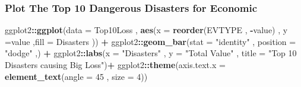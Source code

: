 \documentclass[
]{article}
\newenvironment{Shaded}{\begin{snugshade}}{\end{snugshade}}
\newcommand{\DataTypeTok}[1]{\textcolor[rgb]{0.13,0.29,0.53}{#1}}
\newcommand{\DecValTok}[1]{\textcolor[rgb]{0.00,0.00,0.81}{#1}}
\newcommand{\KeywordTok}[1]{\textcolor[rgb]{0.13,0.29,0.53}{\textbf{#1}}}
\newcommand{\NormalTok}[1]{#1}
\newcommand{\OperatorTok}[1]{\textcolor[rgb]{0.81,0.36,0.00}{\textbf{#1}}}
\newcommand{\StringTok}[1]{\textcolor[rgb]{0.31,0.60,0.02}{#1}}
\begin{document}
\begin{Shaded}
\end{Shaded}

\hypertarget{plot-the-top-10-dangerous-disasters-for-economic}{%
\subsubsection{Plot The Top 10 Dangerous Disasters for
Economic}\label{plot-the-top-10-dangerous-disasters-for-economic}}

\begin{Shaded}
\begin{Highlighting}[]
\NormalTok{ggplot2}\OperatorTok{::}\KeywordTok{ggplot}\NormalTok{(}\DataTypeTok{data =}\NormalTok{ Top10Loss , }\KeywordTok{aes}\NormalTok{(}\DataTypeTok{x =} \KeywordTok{reorder}\NormalTok{(EVTYPE , }\OperatorTok{-}\NormalTok{value) , }\DataTypeTok{y =}\NormalTok{value ,}\DataTypeTok{fill =}\NormalTok{ Disasters )) }\OperatorTok{+}
\StringTok{        }\NormalTok{ggplot2}\OperatorTok{::}\KeywordTok{geom_bar}\NormalTok{(}\DataTypeTok{stat =} \StringTok{"identity"}\NormalTok{ , }\DataTypeTok{position =} \StringTok{"dodge"}\NormalTok{ ,) }\OperatorTok{+}\StringTok{ }
\StringTok{        }\NormalTok{ggplot2}\OperatorTok{::}\KeywordTok{labs}\NormalTok{(}\DataTypeTok{x =} \StringTok{"Disasters"}\NormalTok{ , }\DataTypeTok{y =} \StringTok{"Total Value"}\NormalTok{ , }\DataTypeTok{title =} \StringTok{"Top 10 Disasters causing Big Loss"}\NormalTok{)}\OperatorTok{+}
\StringTok{        }\NormalTok{ggplot2}\OperatorTok{::}\KeywordTok{theme}\NormalTok{(}\DataTypeTok{axis.text.x =} \KeywordTok{element_text}\NormalTok{(}\DataTypeTok{angle =} \DecValTok{45}\NormalTok{ , }\DataTypeTok{size =} \DecValTok{4}\NormalTok{))}
\end{Highlighting}
\end{Shaded}
\end{document}
